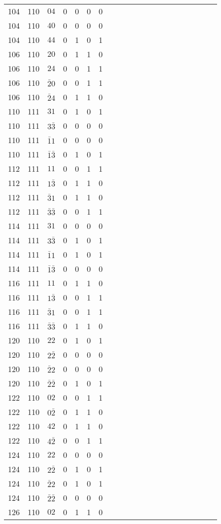 \begin{longtable*}{c| cccccccccccccccccccc }
104& 110& $04$& 0& 0& 0& 0\\
104& 110& $40$& 0& 0& 0& 0\\
104& 110& $44$& 0& 1& 0& 1\\
106& 110& $20$& 0& 1& 1& 0\\
106& 110& $24$& 0& 0& 1& 1\\
106& 110& $\bar{2}0$& 0& 0& 1& 1\\
106& 110& $\bar{2}4$& 0& 1& 1& 0\\
110& 111& $31$& 0& 1& 0& 1\\
110& 111& $3\bar{3}$& 0& 0& 0& 0\\
110& 111& $\bar{1}1$& 0& 0& 0& 0\\
110& 111& $\bar{1}\bar{3}$& 0& 1& 0& 1\\
112& 111& $11$& 0& 0& 1& 1\\
112& 111& $1\bar{3}$& 0& 1& 1& 0\\
112& 111& $\bar{3}1$& 0& 1& 1& 0\\
112& 111& $\bar{3}\bar{3}$& 0& 0& 1& 1\\
114& 111& $31$& 0& 0& 0& 0\\
114& 111& $3\bar{3}$& 0& 1& 0& 1\\
114& 111& $\bar{1}1$& 0& 1& 0& 1\\
114& 111& $\bar{1}\bar{3}$& 0& 0& 0& 0\\
116& 111& $11$& 0& 1& 1& 0\\
116& 111& $1\bar{3}$& 0& 0& 1& 1\\
116& 111& $\bar{3}1$& 0& 0& 1& 1\\
116& 111& $\bar{3}\bar{3}$& 0& 1& 1& 0\\
120& 110& $22$& 0& 1& 0& 1\\
120& 110& $2\bar{2}$& 0& 0& 0& 0\\
120& 110& $\bar{2}2$& 0& 0& 0& 0\\
120& 110& $\bar{2}\bar{2}$& 0& 1& 0& 1\\
122& 110& $02$& 0& 0& 1& 1\\
122& 110& $0\bar{2}$& 0& 1& 1& 0\\
122& 110& $42$& 0& 1& 1& 0\\
122& 110& $4\bar{2}$& 0& 0& 1& 1\\
124& 110& $22$& 0& 0& 0& 0\\
124& 110& $2\bar{2}$& 0& 1& 0& 1\\
124& 110& $\bar{2}2$& 0& 1& 0& 1\\
124& 110& $\bar{2}\bar{2}$& 0& 0& 0& 0\\
126& 110& $02$& 0& 1& 1& 0\\

\end{longtable*}
